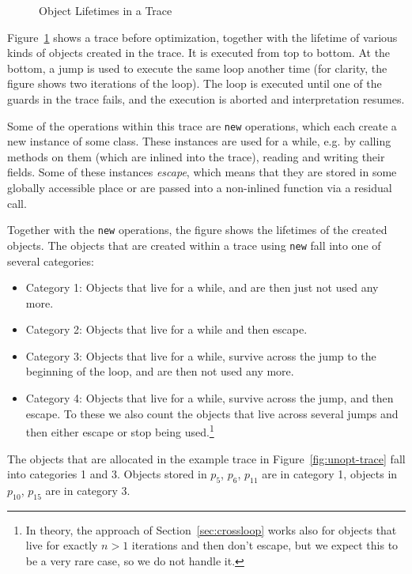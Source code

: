 \documentclass{sigplanconf}
\begin{document}
\begin{figure}
\caption{Object Lifetimes in a Trace}
\label{fig:lifetimes}
\end{figure}

Figure~\ref{fig:lifetimes} shows a trace before optimization, together with the
lifetime of various kinds of objects created in the trace. It is executed from
top to bottom. At the bottom, a jump is used to execute the same loop another
time (for clarity, the figure shows two iterations of the loop). The loop is
executed until one of the guards in the trace fails, and the execution is
aborted and interpretation resumes.

Some of the operations within this trace are \texttt{new} operations, which each
create a new instance of some class. These instances are used for a while, e.g.
by calling methods on them (which are inlined into the trace), reading and
writing their fields. Some of these instances \emph{escape}, which means that
they are stored in some globally accessible place or are passed into a
non-inlined function via a residual call.

Together with the \texttt{new} operations, the figure shows the lifetimes of the
created objects. The objects that are created within a trace using \texttt{new}
fall into one of several categories:

\begin{itemize}
    \item Category 1: Objects that live for a while, and are then just not
    used any more.

    \item Category 2: Objects that live for a while and then escape.

    \item Category 3: Objects that live for a while, survive across the jump to
    the beginning of the loop, and are then not used any more.

    \item Category 4: Objects that live for a while, survive across the jump,
    and then escape. To these we also count the objects that live across several
    jumps and then either escape or stop being used.\footnote{In theory, the
    approach of Section~\ref{sec:crossloop} works also for objects that live for
    exactly $n>1$ iterations and then don't escape, but we expect this to be a
    very rare case, so we do not handle it.}
\end{itemize}

The objects that are allocated in the example trace in
Figure~\ref{fig:unopt-trace} fall into categories 1 and 3. Objects stored in
$p_{5}$, $p_{6}$, $p_{11}$ are in category 1, objects in $p_{10}$, $p_{15}$ are in
category 3.
\end{document}
